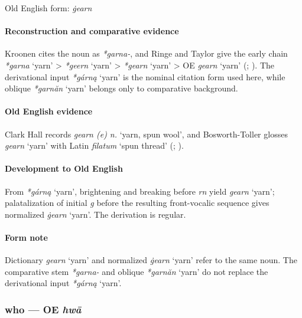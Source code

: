 \documentclass[
  british,
  a4paper,
]{article}
\providecommand{\Recon}[1]{\emph{*#1}}
\begin{document}
Old English form: \emph{ġearn}

\paragraph{Reconstruction and comparative
evidence}\label{reconstruction-and-comparative-evidence-73}

Kroonen cites the noun as \emph{*garna-}, and Ringe and Taylor give the
early chain \Recon{garna} `yarn' \textgreater{} \Recon{geern} `yarn'
\textgreater{} \Recon{gearn} `yarn' \textgreater{} OE {\emph{gearn}}
`yarn' (;
). The
derivational input \Recon{gárną} `yarn' is the nominal citation form
used here, while oblique \Recon{garnăn} `yarn' belongs only to
comparative background.

\paragraph{Old English evidence}\label{old-english-evidence-73}

Clark Hall records \emph{gearn (e) n.} `yarn, spun wool', and
Bosworth-Toller glosses {\emph{gearn}} `yarn' with Latin \emph{filatum}
`spun thread' (;
).

\paragraph{Development to Old
English}\label{development-to-old-english-73}

From \Recon{gárną} `yarn', brightening and breaking before \emph{rn}
yield \emph{gearn} `yarn'; palatalization of initial \emph{g} before the
resulting front-vocalic sequence gives normalized \emph{ġearn} `yarn'.
The derivation is regular.

\paragraph{Form note}\label{form-note-27}

Dictionary \emph{gearn} `yarn' and normalized \emph{ġearn} `yarn' refer
to the same noun. The comparative stem \emph{*garna-} and oblique
\Recon{garnăn} `yarn' do not replace the derivational input
\Recon{gárną} `yarn'.

\subsubsection{\texorpdfstring{who --- OE
\emph{hwā}}{who --- OE hwā}}\label{who-oe-hwux101}
\end{document}

